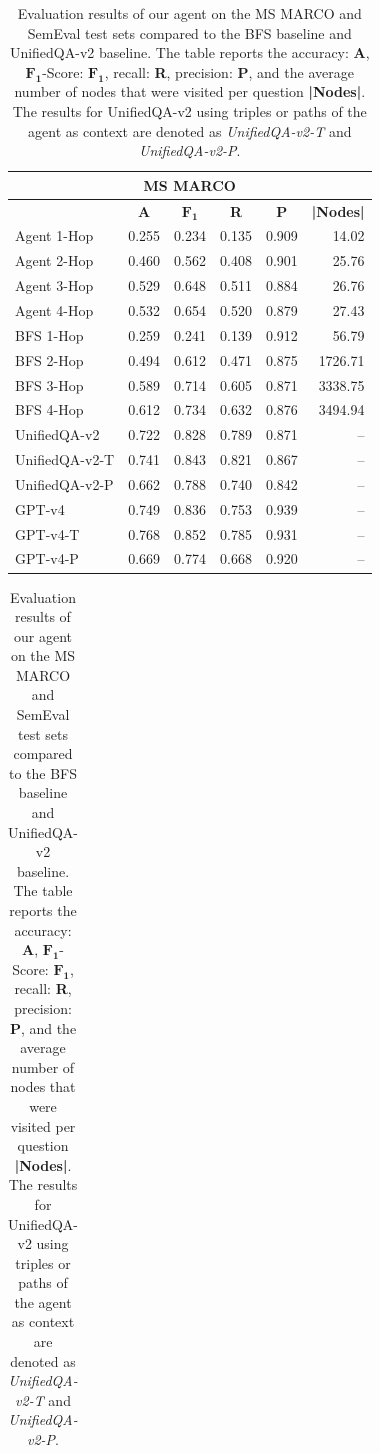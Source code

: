 \begin{table}
\renewcommand{\tabcolsep}{7.9pt}
\centering
\caption{Evaluation results of our agent on the MS MARCO and SemEval test sets compared to the BFS baseline and UnifiedQA-v2 baseline. The table reports the accuracy: \textbf{A}, $\mathbf{F_1}$-Score: $\mathbf{F_1}$, recall: \textbf{R}, precision: \textbf{P}, and the average number of nodes that were visited per question \textbf{|Nodes|}. The results for UnifiedQA-v2 using triples or paths of the agent as context are denoted as \textit{UnifiedQA-v2-T} and \textit{UnifiedQA-v2-P}.}
\label{table-evaluation}
\begin{tabular}{@{}lccccr@{}} 
  \toprule
  \multicolumn{6}{c}{\textbf{MS MARCO}}\\
  \midrule
  & \textbf{A} & \textbf{$\mathbf{F_1}$} & \textbf{R} & \textbf{P} & \textbf{|Nodes|}\\
  \midrule
  Agent 1-Hop    & 0.255 & 0.234 & 0.135 & 0.909 & 14.02 \\
  Agent 2-Hop    & 0.460 & 0.562 & 0.408 & 0.901 & 25.76 \\
  Agent 3-Hop    & 0.529 & 0.648 & 0.511 & 0.884 & 26.76 \\
  Agent 4-Hop    & 0.532 & 0.654 & 0.520 & 0.879 & 27.43 \\
  \midrule
  BFS 1-Hop      & 0.259 & 0.241 & 0.139 & 0.912 &   56.79 \\
  BFS 2-Hop      & 0.494 & 0.612 & 0.471 & 0.875 & 1726.71 \\
  BFS 3-Hop      & 0.589 & 0.714 & 0.605 & 0.871 & 3338.75 \\
  BFS 4-Hop      & 0.612 & 0.734 & 0.632 & 0.876 & 3494.94 \\
  \midrule
  UnifiedQA-v2   & 0.722 & 0.828 & 0.789 & 0.871 & -- \\
  UnifiedQA-v2-T & 0.741 & 0.843 & 0.821 & 0.867 & -- \\
  UnifiedQA-v2-P & 0.662 & 0.788 & 0.740 & 0.842 & -- \\
  GPT-v4         & 0.749 & 0.836 & 0.753 & 0.939 & -- \\
  GPT-v4-T       & 0.768 & 0.852 & 0.785 & 0.931 & -- \\
  GPT-v4-P       & 0.669 & 0.774 & 0.668 & 0.920 & -- \\
  \bottomrule
\end{tabular}
\label{table-evaluation-semeval}
\centering
\renewcommand{\tabcolsep}{7.88pt}
\hspace{-0.10cm}
\begin{tabular}{@{}lccccr@{}} 

\end{tabular}
\end{table}
